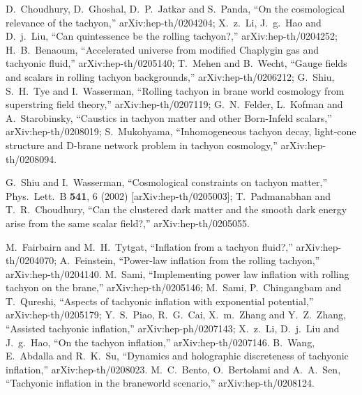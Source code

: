 \documentclass[a4paper,12pt]{article} \textheight=8.5truein
\begin{document}
\begin{thebibliography}{10}
D.~Choudhury, D.~Ghoshal, D.~P.~Jatkar and S.~Panda, ``On the
cosmological relevance of the tachyon,'' arXiv:hep-th/0204204;
X.~z.~Li, J.~g.~Hao and D.~j.~Liu, ``Can quintessence be the
rolling tachyon?,'' arXiv:hep-th/0204252;
H.~B.~Benaoum, ``Accelerated universe from modified Chaplygin gas
and tachyonic fluid,'' arXiv:hep-th/0205140;
T.~Mehen and B.~Wecht, ``Gauge fields and scalars in rolling
tachyon backgrounds,'' arXiv:hep-th/0206212;
G.~Shiu, S.~H.~Tye and I.~Wasserman, ``Rolling tachyon in brane
world cosmology from superstring field theory,''
arXiv:hep-th/0207119;
G.~N.~Felder, L.~Kofman and A.~Starobinsky,
``Caustics in tachyon matter and other Born-Infeld scalars,''
arXiv:hep-th/0208019;
S.~Mukohyama, ``Inhomogeneous tachyon decay, light-cone structure
and D-brane network problem in tachyon cosmology,''
arXiv:hep-th/0208094.

G.~Shiu and I.~Wasserman, ``Cosmological constraints on tachyon
matter,'' Phys.\ Lett.\ B {\bf 541}, 6 (2002)
[arXiv:hep-th/0205003];
T.~Padmanabhan and T.~R.~Choudhury, ``Can the clustered dark
matter and the smooth dark energy arise from the  same scalar
field?,'' arXiv:hep-th/0205055.

M.~Fairbairn and M.~H.~Tytgat, ``Inflation from a tachyon
fluid?,'' arXiv:hep-th/0204070;
A.~Feinstein,
``Power-law inflation from the rolling tachyon,''
arXiv:hep-th/0204140.
M.~Sami, ``Implementing power law inflation with rolling tachyon
on the brane,'' arXiv:hep-th/0205146;
M.~Sami, P.~Chingangbam and T.~Qureshi, ``Aspects of tachyonic
inflation with exponential potential,'' arXiv:hep-th/0205179;
Y.~S.~Piao, R.~G.~Cai, X.~m.~Zhang and Y.~Z.~Zhang, ``Assisted
tachyonic inflation,'' arXiv:hep-ph/0207143;
X.~z.~Li, D.~j.~Liu and J.~g.~Hao,
``On the tachyon inflation,''
arXiv:hep-th/0207146.
B.~Wang, E.~Abdalla and R.~K.~Su,
``Dynamics and holographic discreteness of tachyonic inflation,''
arXiv:hep-th/0208023.
M.~C.~Bento, O.~Bertolami and A.~A.~Sen,
``Tachyonic inflation in the braneworld scenario,''
arXiv:hep-th/0208124.



\end{thebibliography}
\end{document}
